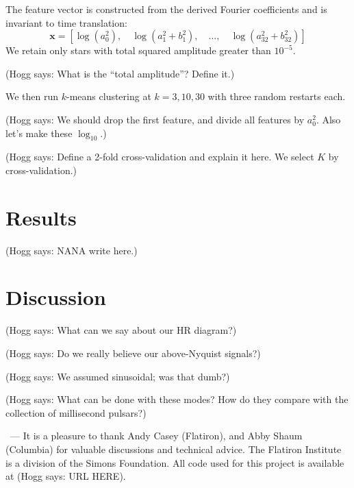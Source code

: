 \documentclass{article}
\renewcommand{\paragraph}[1]{\medskip\par\noindent{\textbf{#1}}~---}
\newcommand{\hogg}[1]{{\color{blue} (Hogg says: #1)}}
\begin{document}
The feature vector is constructed from the derived Fourier coefficients 
and is invariant to time translation:
\begin{equation}
\mathbf{x} = [\log(a_0^2), \quad \log(a_1^2 + b_1^2), \quad \dots, 
\quad \log(a_{32}^2 + b_{32}^2)]
\end{equation}
We retain only stars with total squared amplitude greater than $10^{-5}$.

\hogg{What is the ``total amplitude''? Define it.}

We then run $k$-means clustering at $k = 3, 10, 30$ with three random 
restarts each.

\hogg{We should drop the first feature, and divide all features by $a_0^2$. Also let's make these $\log_{10}$.}

\hogg{Define a 2-fold cross-validation and explain it here. We select $K$ by cross-validation.}



\section{Results}\label{sec:results}
\hogg{NANA write here.}

\section{Discussion}\label{sec:discussion}
\hogg{What can we say about our HR diagram?}

\hogg{Do we really believe our above-Nyquist signals?}

\hogg{We assumed sinusoidal; was that dumb?}

\hogg{What can be done with these modes?
How do they compare with the collection of millisecond pulsars?}

\paragraph{Acknowledgements}
It is a pleasure to thank
  Andy Casey (Flatiron), and
  Abby Shaum (Columbia)
for valuable discussions and technical advice.
The Flatiron Institute is a division of the Simons Foundation.
All code used for this project is available at \hogg{URL HERE}.

\raggedright\footnotesize


\end{document}
